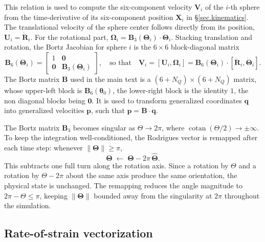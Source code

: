 \documentclass[aps,prfluids,groupedaddress]{revtex4-2}
\newcommand{\bp}{\bm{p}}
\newcommand{\bq}{\bm{q}}
\newcommand{\btheta}{\bm{\theta}}
\newcommand{\bU}{\bm{U}}
\newcommand{\bV}{\bm{V}}
\newcommand{\bX}{\bm{X}}
\newcommand{\bTheta}{\bm{\Theta}}
\newcommand{\bOmega}{\bm{\Omega}}
\newcommand{\tI}{\bm{\mathit{1}}}
\newcommand{\tB}{\bm{{B}}}
\newcommand{\bqd}{\bm{\dot q}}
\newcommand{\bRd}{\bm{{\dot R}}}
\newcommand{\bThetad}{\bm{\dot \Theta}}
\newcommand{\hTheta}{\bm{\hat \Theta}}
\DeclareMathOperator{\cotan}{cotan}
\begin{document}
This relation is used to compute the six-component velocity $\bV_i$ of the $i$-th sphere from the time-derivative of its six-component position $\bX_i$ in \S\ref{sec.kinematics}.
The translational velocity of the sphere center follows directly from its position, $\bU_i = \bRd_i$. For the rotational part, $\bOmega_i = \tB_3(\bTheta_i) \cdot \bThetad_i$.
Stacking translation and rotation, the Bortz Jacobian for sphere $i$ is the $6\times 6$ block-diagonal matrix
\begin{equation}\label{eq:B6}
\tB_6(\bTheta_i) =
\begin{bmatrix} \tI & \mathbf{0} \\ \mathbf{0} & \tB_3(\bTheta_i) \end{bmatrix},
\quad\text{so that}\quad
\bV_i = [\bU_i, \bOmega_i] = \tB_6(\bTheta_i)\cdot[\bRd_i,\bThetad_i].
\end{equation}
The Bortz matrix $\tB$ used in the main text is a $(6+N_Q)\times(6+N_Q)$ matrix, whose upper-left block is $\tB_6(\btheta_0)$, the lower-right block is the identity $\tI$, the non diagonal blocks being $\bm{0}$. It is used to transform generalized coordinates $\bq$ into generalized velocities $\bp$, such that $\bp = \tB\cdot\bqd$. 

The Bortz matrix $\tB_3$ becomes singular as $\Theta\to 2\pi$, where $\cotan(\Theta/2)\to\pm\infty$. To keep the integration well-conditioned, the Rodrigues vector is remapped after each time step: whenever $\|\bTheta\|\geq\pi$,
\begin{equation}
\bTheta \;\leftarrow\; \bTheta - 2\pi\,\hTheta.
\end{equation}
This subtracts one full turn along the rotation axis. Since a rotation by $\Theta$ and a rotation by $\Theta - 2\pi$ about the same axis produce the same orientation, the physical state is unchanged. The remapping reduces the angle magnitude to $2\pi - \Theta \leq \pi$, keeping $\|\bTheta\|$ bounded away from the singularity at $2\pi$ throughout the simulation.

\subsection{Rate-of-strain vectorization\label{app:strain_vec}}
\end{document}

